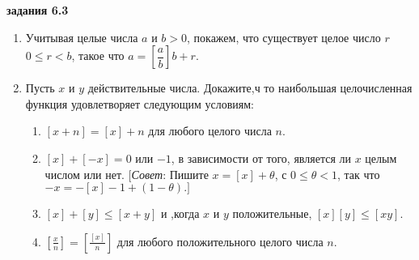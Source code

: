 \documentclass[11pt]{article}
\begin{document}
\newpage
\begin{center}\Large\textbf{задания 6.3}\end{center}
\begin{enumerate}
	\item Учитывая целые числа $ a $ и $ b>0 $, покажем, что существует целое число $ r $ $ 0\le r<b $, такое что $ a=\left[\dfrac{a}{b}\right]b+r. $
	\item Пусть $ x $ и $ y $ действительные числа. Докажите,ч то наибольшая целочисленная функция удовлетворяет следующим условиям:
	\begin{enumerate}
		\item $ \left[ x+n\right] =\left[ x\right] +n $ для любого целого числа $ n. $
		\item $ \left[ x\right] +\left[ -x\right] =0 $ или $ -1 $, в зависимости от того, является ли $ x $ целым числом или нет. [\textit{Совет}: Пишите $ x=\left[ x\right] +\theta $, с $ 0\le\theta<1 $, так что $ -x=-\left[ x\right] -1+\left( 1-\theta\right).]  $
		\item $\left[ x\right] +\left[ y\right] \le \left[ x+y\right]$ и ,когда $ x $ и $ y $ положительные, $\left[ x\right]\left[ y\right] \le\left[ xy\right] $.
		\item $ \left[ \frac{x}{n}\right] =\left[ \frac{\left[ x\right] }{n}\right]  $ для любого положительного целого числа $ n $. 
		

\end{enumerate}
\end{enumerate}
\end{document}

